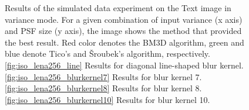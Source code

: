 \documentclass[12pt,notitlepage]{report}
\begin{document}
\begin{figure}[htb]
  \caption[Results for the text image in variance mode]{Results of the simulated data experiment on the Text image in variance mode. For a given combination of input variance (x axis) and PSF size (y axis), the image shows the method that provided the best result. Red color denotes the BM3D algorithm, green and blue denote Tico's and Šroubek's algorithm, respectively. \ref{fig:iso_lena256_line} Results for diagonal line-shaped blur kernel. \ref{fig:iso_lena256_blurkernel7} Results for blur kernel 7. \ref{fig:iso_lena256_blurkernel8} Results for blur kernel 8. \ref{fig:iso_lena256_blurkernel10} Results for blur kernel 10.}
  \label{fig:var_text256}
\end{figure}

\clearpage
\end{document}
